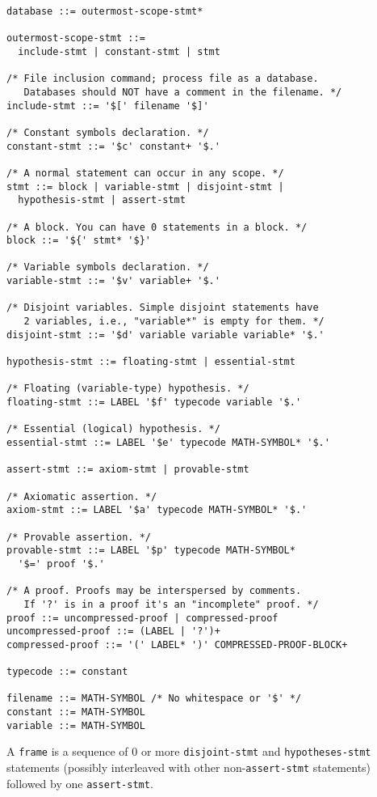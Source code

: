 \begin{verbatim}
database ::= outermost-scope-stmt*

outermost-scope-stmt ::=
  include-stmt | constant-stmt | stmt

/* File inclusion command; process file as a database.
   Databases should NOT have a comment in the filename. */
include-stmt ::= '$[' filename '$]'

/* Constant symbols declaration. */
constant-stmt ::= '$c' constant+ '$.'

/* A normal statement can occur in any scope. */
stmt ::= block | variable-stmt | disjoint-stmt |
  hypothesis-stmt | assert-stmt

/* A block. You can have 0 statements in a block. */
block ::= '${' stmt* '$}'

/* Variable symbols declaration. */
variable-stmt ::= '$v' variable+ '$.'

/* Disjoint variables. Simple disjoint statements have
   2 variables, i.e., "variable*" is empty for them. */
disjoint-stmt ::= '$d' variable variable variable* '$.'

hypothesis-stmt ::= floating-stmt | essential-stmt

/* Floating (variable-type) hypothesis. */
floating-stmt ::= LABEL '$f' typecode variable '$.'

/* Essential (logical) hypothesis. */
essential-stmt ::= LABEL '$e' typecode MATH-SYMBOL* '$.'

assert-stmt ::= axiom-stmt | provable-stmt

/* Axiomatic assertion. */
axiom-stmt ::= LABEL '$a' typecode MATH-SYMBOL* '$.'

/* Provable assertion. */
provable-stmt ::= LABEL '$p' typecode MATH-SYMBOL*
  '$=' proof '$.'

/* A proof. Proofs may be interspersed by comments.
   If '?' is in a proof it's an "incomplete" proof. */
proof ::= uncompressed-proof | compressed-proof
uncompressed-proof ::= (LABEL | '?')+
compressed-proof ::= '(' LABEL* ')' COMPRESSED-PROOF-BLOCK+

typecode ::= constant

filename ::= MATH-SYMBOL /* No whitespace or '$' */
constant ::= MATH-SYMBOL
variable ::= MATH-SYMBOL
\end{verbatim}

A \texttt{frame} is a sequence of 0 or more
\texttt{disjoint-{\allowbreak}stmt} and
\texttt{hypotheses-{\allowbreak}stmt} statements
(possibly interleaved with other non-\texttt{assert-stmt} statements)
followed by one \texttt{assert-stmt}.

